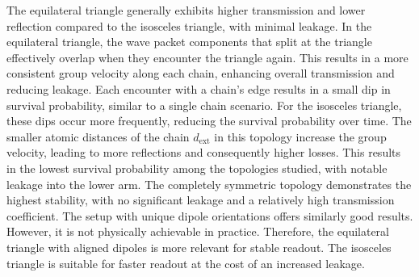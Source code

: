 \noindent
The equilateral triangle generally exhibits higher transmission and lower reflection compared to the isosceles triangle, with minimal leakage.
In the equilateral triangle, the wave packet components that split at the triangle effectively overlap when they encounter the triangle again.
This results in a more consistent group velocity along each chain, enhancing overall transmission and reducing leakage.
Each encounter with a chain's edge results in a small dip in survival probability, similar to a single chain scenario.
For the isosceles triangle, these dips occur more frequently, reducing the survival probability over time.
The smaller atomic distances of the chain $ d_\text{ext} $ in this topology increase the group velocity, leading to more reflections and consequently higher losses.
This results in the lowest survival probability among the topologies studied, with notable leakage into the lower arm.
The completely symmetric topology demonstrates the highest stability, with no significant leakage and a relatively high transmission coefficient.
The setup with unique dipole orientations offers similarly good results.
However, it is not physically achievable in practice.
Therefore, the equilateral triangle with aligned dipoles is more relevant for stable readout.
The isosceles triangle is suitable for faster readout at the cost of an increased leakage.